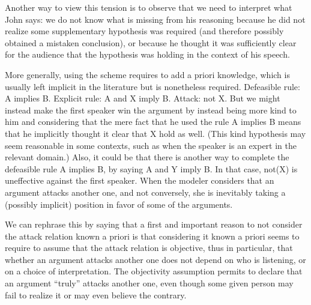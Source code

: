 \documentclass[version=3.21, pagesize, twoside=off, bibliography=totoc, DIV=calc, fontsize=12pt, a4paper, french, english]{scrartcl}
\begin{document}
Another way to view this tension is to observe that we need to interpret what John says: we do not know what is missing from his reasoning because he did not realize some supplementary hypothesis was required (and therefore possibly obtained a mistaken conclusion), or because he thought it was sufficiently clear for the audience that the hypothesis was holding in the context of his speech.

More generally, using the scheme requires to add a priori knowledge, which is usually left implicit in the literature but is nonetheless required. Defeasible rule: A implies B. Explicit rule: A and X imply B. Attack: not X. But we might instead make the first speaker win the argument by instead being more kind to him and considering that the mere fact that he used the rule A implies B means that he implicitly thought it clear that X hold as well. (This kind hypothesis may seem reasonable in some contexts, such as when the speaker is an expert in the relevant domain.) Also, it could be that there is another way to complete the defeasible rule A implies B, by saying A and Y imply B. In that case, not(X) is uneffective against the first speaker. When the modeler considers that an argument attacks another one, and not conversely, she is inevitably taking a (possibly implicit) position in favor of some of the arguments.

We can rephrase this by saying that a first and important reason to not consider the attack relation known a priori is that considering it known a priori seems to require to assume that the attack relation is objective, thus in particular, that whether an argument attacks another one does not depend on who is listening, or on a choice of interpretation. The objectivity assumption permits to declare that an argument “truly” attacks another one, even though some given person may fail to realize it or may even believe the contrary. 
\end{document}
